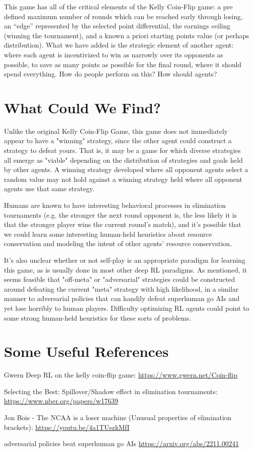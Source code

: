 \documentclass[11pt]{article}
\begin{document}
This game has all of the critical elements of the Kelly Coin-Flip game: a pre defined maximum number of rounds which can be reached early through losing, an “edge” represented by the selected point differential, the earnings ceiling (winning the tournament), and a known a priori starting points value (or perhaps distribution). What we have added is the strategic element of another agent: where each agent is incentivized to win as narrowly over its opponents as possible, to save as many points as possible for the final round, where it should spend everything. How do people perform on this? How should agents?

\section*{What Could We Find?}
\label{sec:orga668e32}

Unlike the original Kelly Coin-Flip Game, this game does not immediately appear to have a "winning" strategy, since the other agent could construct a strategy to defeat yours. That is, it may be a game for which diverse strategies all emerge as "viable" depending on the distribution of strategies and goals held by other agents. A winning strategy developed where all opponent agents select a random value may not hold against a winning strategy held where all opponent agents use that same strategy.

Humans are known to have interesting behavioral processes in elimination tournaments (e.g. the stronger the next round opponent is, the less likely it is that the stronger player wins the current round's match), and it's possible that we could learn some interesting human-held heuristics about resource conservation and modeling the intent of other agents' resource conservation. 

It's also unclear whether or not self-play is an appropriate paradigm for learning this game, as is usually done in most other deep RL paradigms. As mentioned, it seems feasible that "off-meta" or "adversarial" strategies could be constructed around defeating the current "meta" strategy with high likelihood, in a similar manner to adversarial policies that can handily defeat superhuman go AIs and yet lose horribly to human players. Difficulty optimizing RL agents could point to some strong human-held heuristics for these sorts of problems.

\section*{Some Useful References}
\label{sec:org0d91614}

Gwern Deep RL on the kelly coin-flip game: \url{https://www.gwern.net/Coin-flip}

Selecting the Best: Spillover/Shadow effect in elimination tournaments: \url{https://www.nber.org/papers/w17639}

Jon Bois - The NCAA is a loser machine (Unusual properties of elimination brackets): \url{https://youtu.be/4a1TUszkMfI}

adversarial policies beat superhuman go AIs \url{https://arxiv.org/abs/2211.00241}
\end{document}
